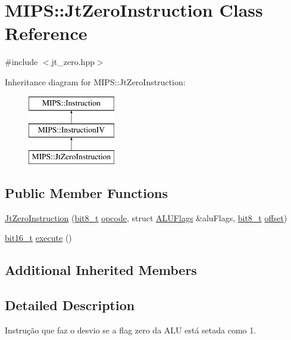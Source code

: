 \hypertarget{classMIPS_1_1JtZeroInstruction}{}\section{M\+I\+PS\+:\+:Jt\+Zero\+Instruction Class Reference}
\label{classMIPS_1_1JtZeroInstruction}


{\ttfamily \#include $<$jt\+\_\+zero.\+hpp$>$}

Inheritance diagram for M\+I\+PS\+:\+:Jt\+Zero\+Instruction\+:\begin{figure}[H]
\begin{center}
\leavevmode
\includegraphics[height=3.000000cm]{classMIPS_1_1JtZeroInstruction}
\end{center}
\end{figure}
\subsection*{Public Member Functions}
\begin{DoxyCompactItemize}
\item 
\hyperlink{classMIPS_1_1JtZeroInstruction_a2968f65f63844b0f2afb5cea2bbcc910}{Jt\+Zero\+Instruction} (\hyperlink{core_8hpp_a6074bae122ae7b527864eec42c728c3c}{bit8\+\_\+t} \hyperlink{classMIPS_1_1Instruction_a45cc6808b5dde8a5d41067d148b55476}{opcode}, struct \hyperlink{structMIPS_1_1ALUFlags}{A\+L\+U\+Flags} \&alu\+Flags, \hyperlink{core_8hpp_a6074bae122ae7b527864eec42c728c3c}{bit8\+\_\+t} \hyperlink{classMIPS_1_1InstructionIV_abcb91e65c800a41bf9c46b5770120b36}{offset})
\item 
\hyperlink{core_8hpp_adc265a970bc35995b5879784bbb3f1b7}{bit16\+\_\+t} \hyperlink{classMIPS_1_1JtZeroInstruction_a8a56439dd5df5fcf00344304b8409e45}{execute} ()
\end{DoxyCompactItemize}
\subsection*{Additional Inherited Members}


\subsection{Detailed Description}
Instrução que faz o desvio se a flag zero da A\+LU está setada como 1.

